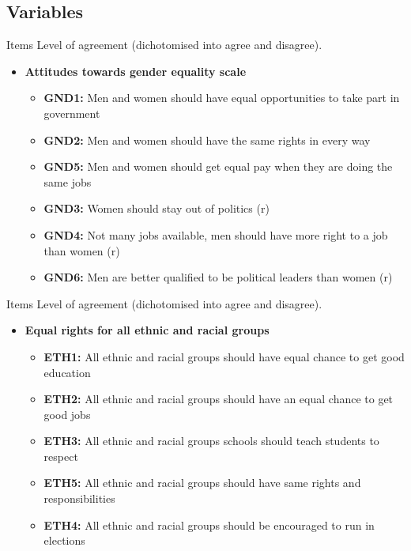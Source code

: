 \documentclass[11pt,t]{beamer}
\begin{document}
\subsection{Variables}
\begin{frame}{Items}
\vspace{5pt}
Level of agreement (dichotomised into agree and disagree).  
\vspace{5pt}
\begin{itemize}
\item \textbf{Attitudes towards gender equality scale}
\vspace{5pt}
	\begin{itemize}
		\item \textbf{GND1:} Men and women should have equal opportunities to take part in government
		\item \textbf{GND2:} Men and women should have the same rights in every way
		\item \textbf{GND5:} Men and women should get equal pay when they are doing the same jobs
		\item \textbf{GND3:} Women should stay out of politics (r)
		\item \textbf{GND4:} Not many jobs available, men should have more right to a job than women (r)
		\item \textbf{GND6:} Men are better qualified to be political leaders than women (r)
	\end{itemize}
\end{itemize}
\end{frame}

\begin{frame}{Items}
\vspace{5pt}
Level of agreement (dichotomised into agree and disagree).  
\vspace{5pt}
\begin{itemize}
\item \textbf{Equal rights for all ethnic and racial groups}
\vspace{5pt}
	\begin{itemize}
		\item \textbf{ETH1:} All ethnic and racial groups should have equal chance to get good education
		\item \textbf{ETH2:} All ethnic and racial groups should have an equal chance to get good jobs
		\item \textbf{ETH3:} All ethnic and racial groups schools should teach students to respect
		\item \textbf{ETH5:} All ethnic and racial groups should have same rights and responsibilities
		\item \textbf{ETH4:} All ethnic and racial groups should be encouraged to run in elections
	\end{itemize}
\end{itemize}
\end{frame}
\end{document}
